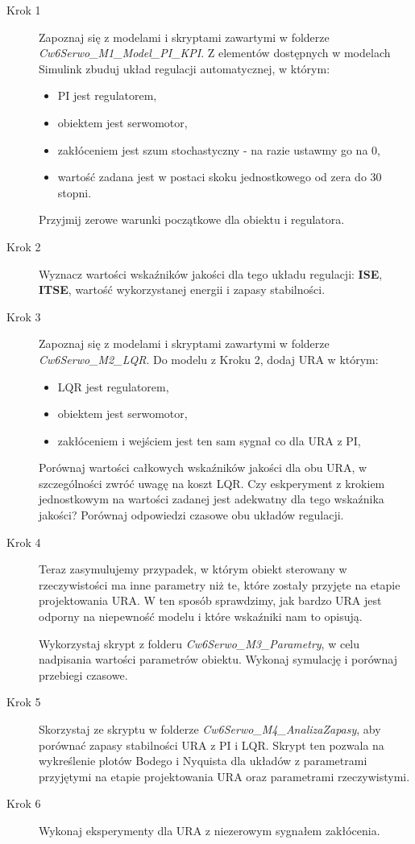 \documentclass{sprawozdanie-agh}
\begin{document}
\begin{description}
\item[Krok 1] Zapoznaj się z modelami i skryptami zawartymi w folderze \textit{Cw6Serwo\_M1\_Model\_PI\_KPI}. Z elementów dostępnych w modelach Simulink zbuduj układ regulacji automatycznej, w którym:
\begin{itemize}
    \item PI jest regulatorem,
    \item obiektem jest serwomotor,
    \item zakłóceniem jest szum stochastyczny - na razie ustawmy go na 0,
    \item wartość zadana jest w postaci skoku jednostkowego od zera do 30 stopni.
\end{itemize}
Przyjmij zerowe warunki początkowe dla obiektu i regulatora.
\item[Krok 2] Wyznacz wartości wskaźników jakości dla tego układu regulacji: \textbf{ISE}, \textbf{ITSE}, wartość wykorzystanej energii i zapasy stabilności.
\item[Krok 3] Zapoznaj się z modelami i skryptami zawartymi w folderze \textit{Cw6Serwo\_M2\_LQR}. Do modelu z Kroku 2, dodaj URA w którym:
\begin{itemize}
    \item LQR jest regulatorem,
    \item obiektem jest serwomotor,
    \item zakłóceniem i wejściem jest ten sam sygnał co dla URA z PI, 
\end{itemize}
Porównaj wartości całkowych wskaźników jakości dla obu URA, w szczególności zwróć uwagę na koszt LQR. Czy eskperyment z krokiem jednostkowym na wartości zadanej jest adekwatny dla tego wskaźnika jakości?
Porównaj odpowiedzi czasowe obu układów regulacji.
\item[Krok 4] Teraz zasymulujemy przypadek, w którym obiekt sterowany w rzeczywistości ma inne parametry niż te, które zostały przyjęte na etapie projektowania URA.
W ten sposób sprawdzimy, jak bardzo URA jest odporny na niepewność modelu i które wskaźniki nam to opisują. 

Wykorzystaj skrypt z folderu \textit{Cw6Serwo\_M3\_Parametry}, w celu nadpisania wartości parametrów obiektu. Wykonaj symulację i porównaj przebiegi czasowe.

\item[Krok 5] Skorzystaj ze skryptu w folderze \textit{Cw6Serwo\_M4\_AnalizaZapasy}, aby porównać zapasy stabilności URA z PI i LQR. Skrypt ten pozwala na wykreślenie plotów Bodego i Nyquista dla układów z parametrami przyjętymi na etapie projektowania URA oraz parametrami rzeczywistymi.

\item[Krok 6] Wykonaj eksperymenty dla URA z niezerowym sygnałem zakłócenia.
\end{description}
\end{document}
